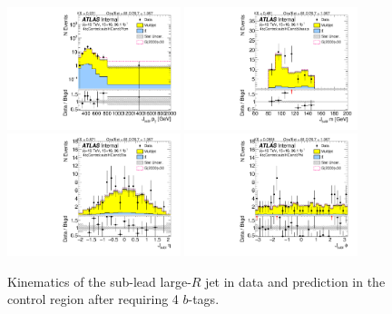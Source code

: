 \begin{figure}[htbp!]
\begin{center}
\includegraphics[width=0.45\textwidth,angle=-90]{figures/boosted/Control/b77_FourTag_Control_sublHCand_Pt_m_1.pdf}
\includegraphics[width=0.45\textwidth,angle=-90]{figures/boosted/Control/b77_FourTag_Control_sublHCand_Mass_s.pdf}\\
\includegraphics[width=0.45\textwidth,angle=-90]{figures/boosted/Control/b77_FourTag_Control_sublHCand_Eta.pdf}
\includegraphics[width=0.45\textwidth,angle=-90]{figures/boosted/Control/b77_FourTag_Control_sublHCand_Phi.pdf}
  \caption{Kinematics of the sub-lead large-$R$ jet in data and prediction in the control region after requiring 4 $b$-tags. }
  \label{fig:boosted-4b-control-ak10-subl}
\end{center}
\end{figure}

